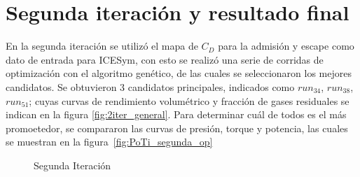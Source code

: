 \section{Segunda iteración y resultado final}
%
En la segunda iteración se utilizó el mapa de $C_D$ para la admisión y escape
como dato de entrada para ICESym, con esto se realizó una serie de corridas de
optimización con el algoritmo genético, de las cuales se seleccionaron los
mejores candidatos.
%
Se obtuvieron 3 candidatos principales, indicados como \emph{$run_{34}$},
\emph{$run_{38}$}, \emph{$run_{51}$}; cuyas curvas de rendimiento volumétrico y
fracción de gases residuales se indican en la figura \ref{fig:2iter_general}.
%
Para determinar cuál de todos es el más promoetedor, se compararon las curvas
de presión, torque y potencia, las cuales se muestran en la figura~\ref{fig:PoTi_segunda_op}

\begin{figure}
  \begin{center}
\end{center}
\caption{Segunda Iteración} \label{fig:primer_op}
\end{figure}


